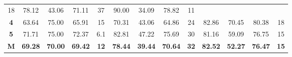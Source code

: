 \begin{table}[H]
{\begin{tabular}{ccccccccccccc}
		\multicolumn{1}{c|}{18} &
		\multicolumn{1}{c|}{78.12} &
		\multicolumn{1}{c|}{43.06} &
		\multicolumn{1}{c|}{71.11} &
		\multicolumn{1}{c|}{37} &
		\multicolumn{1}{c|}{90.00} &
		\multicolumn{1}{c|}{34.09} &
		\multicolumn{1}{c|}{78.82} &
		\multicolumn{1}{c|}{11} \\ \cline{2-13} 
		\multicolumn{1}{c|}{\cellcolor[HTML]{C0C0C0}\textbf{4}} &
		\multicolumn{1}{c|}{63.64} &
		\multicolumn{1}{c|}{75.00} &
		\multicolumn{1}{c|}{65.91} &
		\multicolumn{1}{c|}{15} &
		\multicolumn{1}{c|}{70.31} &
		\multicolumn{1}{c|}{43.06} &
		\multicolumn{1}{c|}{64.86} &
		\multicolumn{1}{c|}{24} &
		\multicolumn{1}{c|}{82.86} &
		\multicolumn{1}{c|}{70.45} &
		\multicolumn{1}{c|}{80.38} &
		\multicolumn{1}{c|}{18} \\ \cline{2-13} 
		\multicolumn{1}{c|}{\cellcolor[HTML]{C0C0C0}\textbf{5}} &
		\multicolumn{1}{c|}{71.71} &
		\multicolumn{1}{c|}{75.00} &
		\multicolumn{1}{c|}{72.37} &
		\multicolumn{1}{c|}{6.1} &
		\multicolumn{1}{c|}{82.81} &
		\multicolumn{1}{c|}{47.22} &
		\multicolumn{1}{c|}{75.69} &
		\multicolumn{1}{c|}{30} &
		\multicolumn{1}{c|}{81.16} &
		\multicolumn{1}{c|}{59.09} &
		\multicolumn{1}{c|}{76.75} &
		\multicolumn{1}{c|}{15} \\ \cline{2-13} 
		\multicolumn{1}{c|}{\cellcolor[HTML]{FFFE65}\textbf{M}} &
		\multicolumn{1}{c|}{\textbf{69.28}} &
		\multicolumn{1}{c|}{\textbf{70.00}} &
		\multicolumn{1}{c|}{\textbf{69.42}} &
		\multicolumn{1}{c|}{\textbf{12}} &
		\multicolumn{1}{c|}{\textbf{78.44}} &
		\multicolumn{1}{c|}{\textbf{39.44}} &
		\multicolumn{1}{c|}{\textbf{70.64}} &
		\multicolumn{1}{c|}{\textbf{32}} &
		\multicolumn{1}{c|}{\textbf{82.52}} &
		\multicolumn{1}{c|}{\textbf{52.27}} &
		\multicolumn{1}{c|}{\textbf{76.47}} &
		\multicolumn{1}{c|}{\textbf{15}} \\ \cline{2-13} 
	\end{tabular}
}
\end{table}